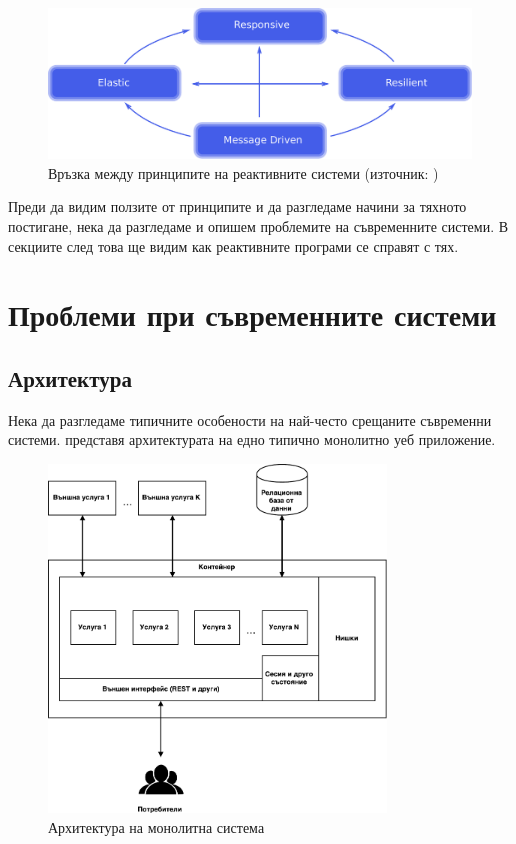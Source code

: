 \begin{figure}
  \includegraphics[width=\textwidth]{images/reactive-traits.pdf}
  \caption[Връзка между принципите на реактивните системи]{Връзка между принципите на реактивните системи (източник: \cite{reactiveManifesto})}
  \label{fig:reactive-trats}
\end{figure}

Преди да видим ползите от принципите и да разгледаме начини за тяхното постигане, нека да разгледаме и опишем проблемите на съвременните системи. В секциите след това ще видим как реактивните програми се справят с тях.

\section{Проблеми при съвременните системи}

\subsection{Архитектура}

Нека да разгледаме типичните особености на най-често срещаните съвременни системи.  представя архитектурата на едно типично монолитно уеб приложение.

\begin{figure}[th]
  \centering\includegraphics[width=0.8\textwidth]{images/monolithic-architecture.pdf}
  \caption{Архитектура на монолитна система}
  \label{fig:monolithic-architecture}
\end{figure}

